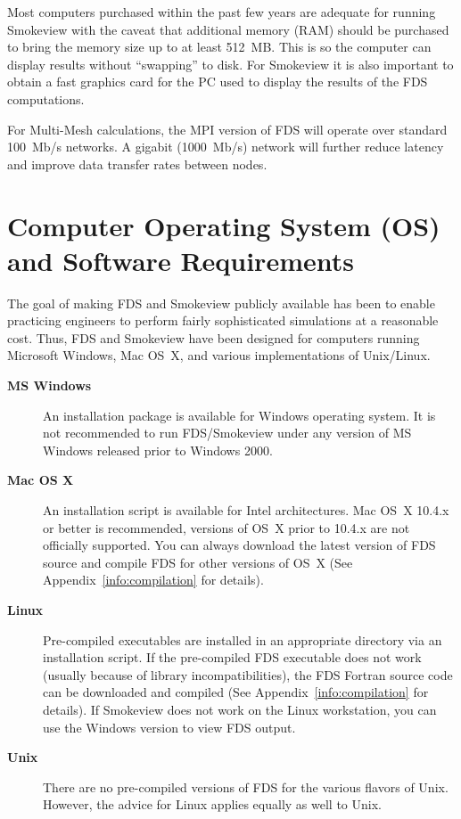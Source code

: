 \documentclass[11pt]{book}
\begin{document}
Most computers purchased within the past few years are adequate for running Smokeview with the caveat that additional memory (RAM) should be purchased to bring the memory size up to at least 512~MB. This is so the computer can display results without ``swapping'' to disk. For Smokeview it is also important to obtain a fast graphics card for the PC used to display the results of the FDS computations.

For Multi-Mesh calculations, the MPI version of FDS will operate over standard 100~Mb/s networks. A gigabit (1000~Mb/s) network will further reduce latency and improve data transfer rates between nodes.


\section{Computer Operating System (OS) and Software Requirements}

The goal of making FDS and Smokeview publicly available has been to enable practicing engineers to perform fairly sophisticated simulations at a reasonable cost. Thus, FDS and Smokeview have been designed for computers running Microsoft Windows, Mac OS~X, and various implementations of Unix/Linux.
\begin{description}
\item[{\bf MS Windows}] An installation package is available for Windows operating system. It is not recommended to run FDS/Smokeview under any version of MS Windows released prior to Windows 2000.
\item[{\bf Mac OS X}] An installation script is available for Intel architectures. Mac OS~X 10.4.x or better is recommended, versions of OS~X prior to 10.4.x are not officially supported. You can always download the latest version of FDS source and compile FDS for other versions of OS~X (See Appendix~\ref{info:compilation} for details).
\item[{\bf Linux}] Pre-compiled executables are installed in an appropriate directory via an installation script. If the pre-compiled FDS executable does not work (usually because of library incompatibilities), the FDS Fortran source code can be downloaded and compiled (See Appendix~\ref{info:compilation} for details). If Smokeview does not work on the Linux workstation, you can use the Windows version to view FDS output.
\item[{\bf Unix}] There are no pre-compiled versions of FDS for the various flavors of Unix. However, the advice for Linux applies equally as well to Unix.
\end{description}
\end{document}
